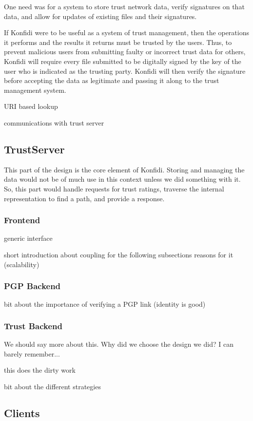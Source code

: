\documentclass[onecolumn]{acm_proc_article-sp}
\begin{document}
One need was for a system to store trust network data, verify signatures on that data, and allow for updates of existing files and their signatures.

If Konfidi were to be useful as a system of trust management, then the operations it performs and the results it returns must be trusted by the users.  Thus, to prevent malicious users from submitting faulty or incorrect trust data for others, Konfidi will require every file submitted to be digitally signed by the key of the user who is indicated as the trusting party.  Konfidi will then verify the signature before accepting the data as legitimate and passing it along to the trust management system.

URI based lookup

communications with trust server

\subsection{TrustServer}
This part of the design is the core element of Konfidi.  Storing and managing the data would not be of much use in this context unless we did something with it.  So, this part would handle requests for trust ratings, traverse the internal representation to find a path, and provide a response.  

\subsubsection{Frontend}
generic interface

short introduction about coupling for the following subsections
reasons for it (scalability)

\subsubsection{PGP Backend}
bit about the importance of verifying a PGP link (identity is good)

\subsubsection{Trust Backend}
We should say more about this.  Why did we choose the design we did?  I can barely remember...

this does the dirty work

bit about the different strategies

\subsection{Clients}
\end{document}
